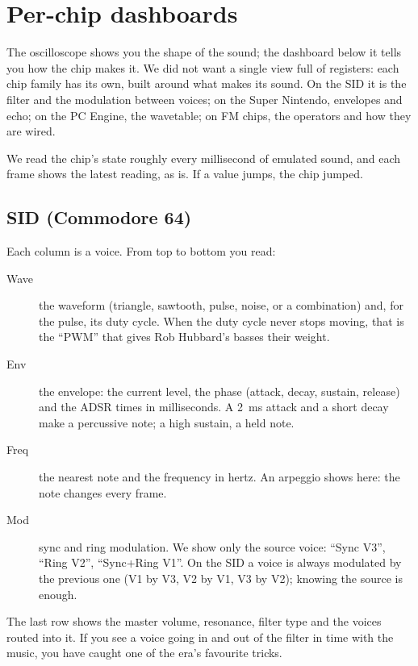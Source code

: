 \chapter{Per-chip dashboards}\label{chap:dashboards}

The oscilloscope shows you the shape of the sound; the dashboard below it tells you how the chip makes it. We did not
want a single view full of registers: each chip family has its own, built around what makes its sound. On the SID it
is the filter and the modulation between voices; on the Super Nintendo, envelopes and echo; on the PC Engine, the
wavetable; on FM chips, the operators and how they are wired.

We read the chip's state roughly every millisecond of emulated sound, and each frame shows the latest reading, as is.
If a value jumps, the chip jumped.

\section{SID (Commodore 64)}
Each column is a voice. From top to bottom you read:
\begin{description}
  \item[Wave] the waveform (triangle, sawtooth, pulse, noise, or a combination) and, for the pulse, its duty cycle.
        When the duty cycle never stops moving, that is the ``PWM'' that gives Rob Hubbard's basses their weight.
  \item[Env] the envelope: the current level, the phase (attack, decay, sustain, release) and the ADSR times in
        milliseconds. A 2~ms attack and a short decay make a percussive note; a high sustain, a held note.
  \item[Freq] the nearest note and the frequency in hertz. An arpeggio shows here: the note changes every frame.
  \item[Mod] sync and ring modulation. We show only the source voice: ``Sync V3'', ``Ring V2'', ``Sync+Ring V1''. On
        the SID a voice is always modulated by the previous one (V1 by V3, V2 by V1, V3 by V2); knowing the source is
        enough.
\end{description}
The last row shows the master volume, resonance, filter type and the voices routed into it. If you see a voice going
in and out of the filter in time with the music, you have caught one of the era's favourite tricks.

